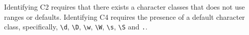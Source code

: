 Identifying C2 requires that there exists a character classes that does not use ranges or defaults.
Identifying C4 requires the presence of a default character class, specifically, \verb!\d!, \verb!\D!, \verb!\w!, \verb!\W!, \verb!\s!, \verb!\S! and \verb!.!.

